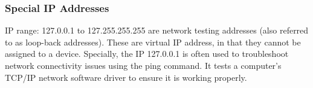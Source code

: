 \subsubsection{Special IP Addresses}
IP range: 127.0.0.1 to 127.255.255.255 are network testing addresses
(also referred to as loop-back addresses). These are virtual IP address,
in that they cannot be assigned to a device. Specially, the IP
127.0.0.1 is often used to troubleshoot network connectivity issues
using the ping command. It tests a computer's TCP/IP network software
driver to ensure it is working properly.
